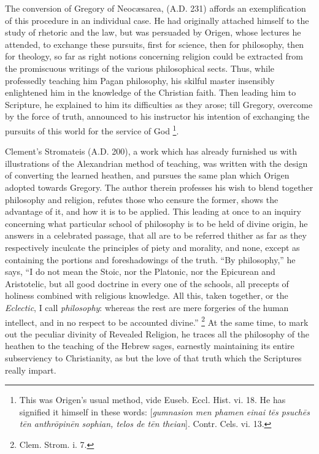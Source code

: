 The conversion of Gregory of Neocæsarea, (A.D.
231) affords an exemplification of this procedure in an individual
case. He had originally attached himself to the study of rhetoric and
the law, but was persuaded by Origen, whose lectures he attended, to
exchange these pursuits, first for science, then for philosophy, then
for theology, so far as right notions concerning religion could be
extracted from the promiscuous writings of the various
philosophical sects. Thus, while professedly teaching him Pagan
philosophy, his skilful master insensibly enlightened him in the
knowledge of the Christian faith. Then leading him to Scripture, he
explained to him its difficulties as they arose; till Gregory,
overcome by the force of truth, announced to his instructor his
intention of exchanging the pursuits of this world for the service of
God \footnote{This was Origen's usual method, vide Euseb.
Eccl. Hist. vi. 18. He has signified it himself in these words: [\emph{gumnasion
men phamen einai t\={e}s psuch\={e}s t\={e}n anthr\={o}pin\={e}n
sophian, telos de t\={e}n theian}]. Contr. Cels. vi. 13.}.

Clement's Stromateis (A.D. 200), a work which
has already furnished us with illustrations of the Alexandrian method
of teaching, was written with the design of converting the learned
heathen, and pursues the same plan which Origen adopted towards
Gregory. The author therein professes his wish to blend together
philosophy and religion, refutes those who censure the former, shows
the advantage of it, and how it is to be applied. This leading at once
to an inquiry concerning what particular school of philosophy is to be
held of divine origin, he answers in a celebrated passage, that all
are to be referred thither as far as they respectively inculcate the
principles of piety and morality, and none, except as containing the
portions and foreshadowings of the truth. ``By philosophy,''
he says, ``I do not mean the Stoic, nor the Platonic, nor the
Epicurean and Aristotelic, but all good doctrine in every one of the
schools, all precepts of holiness combined with religious knowledge.
All this, taken together, or the \emph{Eclectic}, I call \emph{philosophy}:
whereas the rest are mere forgeries of the human intellect, and
in no respect to be accounted divine.'' \footnote{Clem. Strom. i. 7.} At the same time, to mark out the peculiar divinity of
Revealed Religion, he traces all the philosophy of the heathen to the
teaching of the Hebrew sages, earnestly maintaining its entire
subserviency to Christianity, as but the love of that truth which the
Scriptures really impart.

